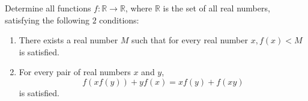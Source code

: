 Determine all functions $f:\mathbb{R}\to\mathbb{R}$, where $\mathbb{R}$ is the set of all real numbers, satisfying the following $2$ conditions:
\begin{enumerate}[label=(\roman*)]
	\item There exists a real number $M$ such that for every real number $x,f(x)<M$ is satisfied.
	\item For every pair of real numbers $x$ and $y$, \[ f(xf(y))+yf(x)=xf(y)+f(xy)\] is satisfied.
\end{enumerate}
